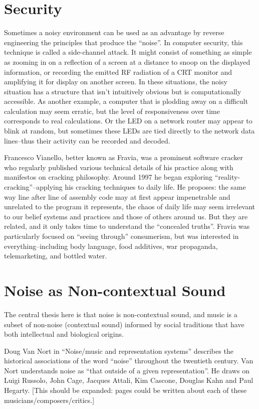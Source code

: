 \documentclass{thesis}
\begin{document}
\section{Security}
	Sometimes a noisy environment can be used as an advantage by reverse engineering the principles that produce the ``noise''. In computer security, this technique is called a side-channel attack. It might consist of something as simple as zooming in on a reflection of a screen at a distance to snoop on the displayed information,\cite{w._wayt_gibbs_hackers_2009} or recording the emitted RF radiation of a CRT monitor and amplifying it for display on another screen.\cite{erik_thiele_tempest_????} In these situations, the noisy situation has a structure that isn't intuitively obvious but is computationally accessible. As another example, a computer that is plodding away on a difficult calculation may seem erratic, but the level of responsiveness over time corresponds to real calculations. Or the LED on a network router may appear to blink at random, but sometimes these LEDs are tied directly to the network data lines--thus their activity can be recorded and decoded.
	
	Francesco Vianello, better known as Fravia, was a prominent software cracker who regularly published various technical details of his practice along with manifestos on cracking philosophy. Around 1997 he began exploring ``reality-cracking''\cite{francesco_vianello_reality_????}--applying his cracking techniques to daily life. He proposes: the same way line after line of assembly code may at first appear impenetrable and unrelated to the program it represents, the chaos of daily life may seem irrelevant to our belief systems and practices and those of others around us. But they are related, and it only takes time to understand the ``concealed truths''. Fravia was particularly focused on ``seeing through'' consumerism, but was interested in everything--including body language, food additives, war propaganda, telemarketing, and bottled water.
	
\section{Noise as Non-contextual Sound}
	The central thesis here is that noise is non-contextual sound, and music is a subset of non-noise (contextual sound) informed by social traditions that have both intellectual and biological origins.

	Doug Van Nort in ``Noise/music and representation systems''\cite{Vannort06} describes the historical associations of the word ``noise'' throughout the twentieth century. Van Nort understands noise as ``that outside of a given representation''. He draws on Luigi Russolo\cite{Russolo04}, John Cage\cite{Cage61}, Jacques Attali\cite{Attali85}, Kim Cascone\cite{Cascone00}, Douglas Kahn\cite{Kahn01} and Paul Hegarty\cite{Hegarty02}. [This should be expanded: pages could be written about each of these musicians/composers/critics.]
\end{document}
